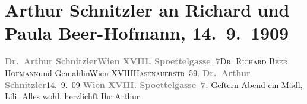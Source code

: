 

         
         \renewcommand{\erwaehntePersonen}{Personen: Richard Beer-Hofmann, Paula Beer-Hofmann, Lili Schnitzler}
         \renewcommand{\erwaehnteOrte}{Orte: Edmund-Weiß-Gasse, Hasenauerstraße, Wien, XVIII., Währing}
         \renewcommand{\erwaehnteWerke}{}
               \section[Arthur Schnitzler an Richard und Paula Beer-Hofmann, 14. 9. 1909]{ Arthur Schnitzler an Richard und Paula Beer-Hofmann,
               14. 9. 1909}\nopagebreak{}\rehead{ }\begin{ledgroupsized}[t]{13cm}\normalsize\beginnumbering \toendnotes[C]{\smallbreak\pagebreak[2]} 
\pstart{}{\pb}\textcolor{gray}{\textbf{Dr. Arthur
                     Schnitzler}}\pend{}\pstart{}\textcolor{gray}{\textbf{Wien XVIII.
                        Spoettelgasse 7}}\pend{}{\bigskip}\pstart{}{\pb}\textsc{Dr. Richard Beer
                     Hofmann}\pend{}\pstart{}und Gemahlin\pend{}\pstart{}Wien XVIII\pend{}\pstart{}\textsc{Hasenauerstr 59}.\pend{}{\bigskip}\pstart
           \noindent{}{\pb}\textcolor{gray}{\textbf{Dr. Arthur Schnitzler}}\hfill 14. 9. 09\pend
           \pstart
           \textcolor{gray}{\textbf{Wien XVIII. Spoettelgasse 7.}}\pend
           \pstart
           Geſtern Abend ein Mädl, Lili. Alles wohl.\pend
           \pstart herzlichſt Ihr \spacefill\mbox{Arthur}\pend{}
         
         \endnumbering{}\end{ledgroupsized}  \newcommand{\dateiname}{L01873}\newcommand{\titel}{Arthur Schnitzler an Richard und Paula Beer-Hofmann, 14. 9. 1909}\newcommand{\editorInnen}{Martin Anton Müller und Gerd-Hermann Susen}
      